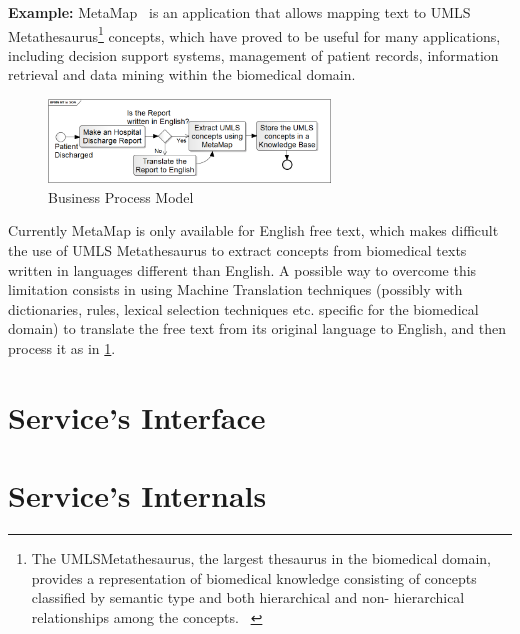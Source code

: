 \documentclass[11pt]{article}
\begin{document}
{\bf Example:} MetaMap~\cite{metamap} is an application that allows mapping text to UMLS\textregistered 
Metathesaurus\textregistered\footnote{The UMLS\textregistered Metathesaurus\textregistered, the largest thesaurus in the biomedical domain, provides a 
representation of biomedical knowledge consisting of concepts classified by semantic type and both hierarchical and non-
hierarchical relationships among the concepts. ~\cite{umls}} concepts, which have proved to be useful for many applications, including decision support systems, 
management of patient records, information retrieval and data mining within the biomedical domain.

\begin{figure}[!ht]
\begin{center}
\includegraphics[width=7.5cm]{mtsoa}
\end{center}
\caption{Business Process Model}
\label{fig:mtsoa}
\end{figure}

Currently MetaMap is only available for English free text, which makes difficult the use of UMLS Metathesaurus to extract concepts from 
biomedical texts written in languages different than English. A possible way to overcome this limitation consists in using Machine Translation
techniques (possibly with dictionaries, rules, lexical selection techniques etc. specific for the biomedical domain) to translate the free text
from its original language to English, and then process it as in \ref{fig:mtsoa}.

\section{Service's Interface}


\section{Service's Internals}
\end{document}
